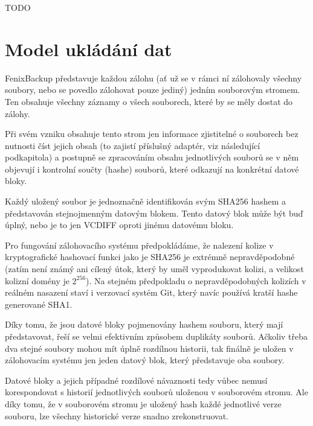 TODO

\section{Model ukládání dat}

FenixBackup představuje každou zálohu (ať už se v rámci ní zálohovaly všechny
soubory, nebo se povedlo zálohovat pouze jediný) jedním souborovým stromem. Ten
obsahuje všechny záznamy o všech souborech, které by se měly dostat do zálohy.

Při svém vzniku obsahuje tento strom jen informace zjistitelné o souborech bez
nutnosti číst jejich obsah (to zajistí příslušný adaptér, viz následující
podkapitola) a postupně se zpracováním obsahu jednotlivých souborů se v něm
objevují i kontrolní součty (hashe) souborů, které odkazují na konkrétní datové
bloky.


Každý uložený soubor je jednoznačně identifikován svým \gls{SHA256} hashem
a představován stejnojmenným datovým blokem. Tento datový blok může být buď
úplný, nebo je to jen \gls{VCDIFF} oproti jinému datovému bloku.

Pro fungování zálohovacího systému předpokládáme, že nalezení kolize v
kryptografické hashovací funkci jako je \gls{SHA256} je extrémně
nepravděpodobné (zatím není známý ani cílený útok, který by uměl vyprodukovat
kolizi, a velikost kolizní domény je $2^256$). Na stejném předpokladu
o nepravděpodobných kolizích v reálném nasazení staví i verzovací systém Git,
který navíc používá kratší hashe generované \gls{SHA1}.

Díky tomu, že jsou datové bloky pojmenovány hashem souboru, který mají
představovat, řeší se velmi efektivním způsobem duplikáty souborů. Ačkoliv třeba
dva stejné soubory mohou mít úplně rozdílnou historii, tak finálně je uložen
v zálohovacím systému jen jeden datový blok, který představuje oba soubory.

Datové bloky a jejich případné rozdílové návaznosti tedy vůbec nemusí
korespondovat s historií jednotlivých souborů uloženou v souborovém stromu. Ale
díky tomu, že v souborovém stromu je uložený hash každé jednotlivé verze
souboru, lze všechny historické verze snadno zrekonstruovat.

